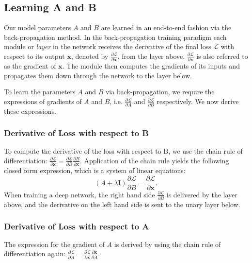 \documentclass[runningheads]{llncs}
\begin{document}
\subsection{Learning A and B}
\label{subsec:learningAB}
Our model parameters $A$ and $B$ are learned in an end-to-end fashion via the back-propagation method.
In the back-propagation training paradigm each module or \emph{layer} in the network receives
the derivative of the final loss $\mathcal{L}$ with respect to its output $\textbf{x}$, denoted by
$\frac{\partial \mathcal{L}}{\partial \textbf{x}}$, from the layer above. $\frac{\partial \mathcal{L}}{\partial \textbf{x}}$ is also referred to as the
gradient of $\textbf{x}$. The module then computes the gradients of its inputs and propagates them down through the
network to the layer below.

To learn the parameters $A$ and $B$ via back-propagation, we require the expressions of gradients of $A$ and $B$, i.e. $\frac{\partial \mathcal{L}}{\partial A}$ and $\frac{\partial \mathcal{L}}{\partial B}$ respectively. We now derive these expressions.


\subsubsection{Derivative of Loss with respect to B}
\label{subsubsection:derivative_b}
To compute the derivative of the loss with respect to B, we use the chain rule of differentiation: $\frac{\partial \mathcal{L}}{\partial \mathbf{x}}  = \frac{\partial \mathcal{L}}{\partial B}\frac{\partial B}{\partial \mathbf{x}}  $.
Application of the chain rule yields the following closed form expression, which is a system of linear equations:
\begin{equation}
 ( A + \lambda \mathbf{I} ) \frac{\partial \mathcal{L}}{\partial B} = \frac{\partial \mathcal{L}}{\partial \textbf{x}}\text{.}
 \label{eqn:dldbres}
\end{equation}
When training a deep network, the right hand side $\frac{\partial \mathcal{L}}{\partial B}$ is delivered by the layer above, and the derivative on the left hand side is sent to the unary layer below. 

\subsubsection{Derivative of Loss with respect to A}
The expression for the gradient of $A$ is derived by using the chain rule of differentiation again: $\frac{\partial \mathcal{L}}{\partial A} =\frac{\partial \mathcal{L}}{\partial \mathbf{x}}  \frac{\partial \mathbf{x}}{\partial A}$. 
\end{document}
